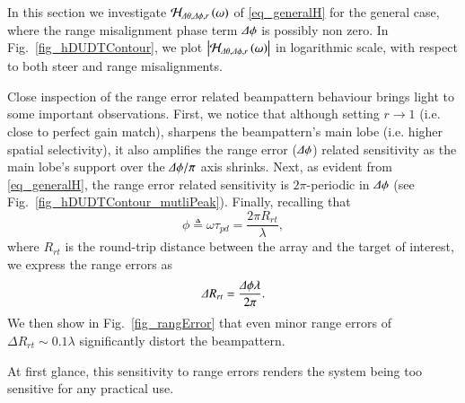 \documentclass[journal]{IEEEtran}
\begin{document}
In this section we investigate $\mathcal{H}_{\Delta\theta,\Delta\phi,r}\left({\omega}\right)$ of \eqref{eq_generalH} for the general case, where the range misalignment phase term $\Delta\phi$ is possibly non zero. In Fig.~\ref{fig_hDUDTContour}, we plot $\left\vert\mathcal{H}_{\Delta\theta,\Delta\phi,r}\left({\omega}\right)\right\vert$ in logarithmic scale, with respect to both steer and range misalignments.
\par Close inspection of the range error related beampattern behaviour brings light to some important observations.
First, we notice that although setting $r\to1$ (i.e. close to perfect gain match), sharpens the beampattern's main lobe  (i.e. higher spatial selectivity), it also amplifies the range error ($\Delta\phi$) related sensitivity as the main lobe's support over the $\Delta\phi/\pi$ axis shrinks. 
Next, as evident from \eqref{eq_generalH}, the range error related sensitivity is $2\pi$-periodic in $\Delta\phi$ (see Fig.~\ref{fig_hDUDTContour_mutliPeak}).
Finally, recalling that
\[
\phi\triangleq\omega\tau_{pd}=\frac{2\pi R_{rt}}{\lambda},
\]
where $R_{rt}$ is the round-trip distance between the array and the target of interest, we express the range errors as
\[
\Delta R_{rt}=\frac{\Delta\phi \lambda}{2\pi}. 
\]
We then show in Fig.~\ref{fig_rangError} that even minor range errors of $\Delta R_{rt}\sim0.1\lambda$ significantly distort the beampattern.
\par At first glance, this sensitivity to range errors renders the system being too sensitive for any practical use.
\end{document}
